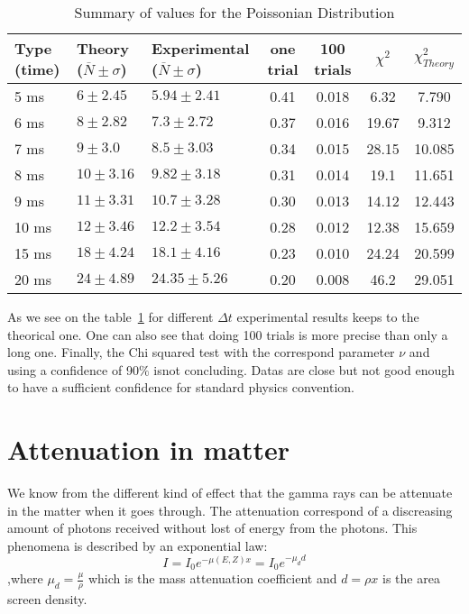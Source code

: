 \documentclass[a4paper,12pt,oneside]{article}
\begin{document}
\begin{table}[h!]
\centering
	\begin{tabular}{|p{2cm}|p{2cm}|p{3cm}|c|c|c|c|}
		 \hline
		 Type (time) & Theory ($\overline{N}\pm\sigma$)& Experimental ($\overline{N}\pm\sigma$) & one trial & 100 trials & $\chi^2$  & $\chi^2_{Theory}$\\
		\hline
		 5 ms & $6\pm 2.45$ & $5.94\pm 2.41$ & 0.41 & 0.018 & 6.32 & 7.790\\
		 6 ms & $8\pm 2.82$ & $7.3\pm 2.72$ & 0.37 & 0.016 & 19.67 & 9.312\\
		 7 ms & $9\pm 3.0$ & $8.5\pm 3.03$ & 0.34 & 0.015 & 28.15 & 10.085\\
		 8 ms & $10\pm 3.16$ & $9.82\pm 3.18$ & 0.31 & 0.014 & 19.1 & 11.651\\
		 9 ms & $11\pm 3.31$ & $10.7\pm 3.28$ & 0.30 & 0.013 & 14.12 & 12.443\\
		 10 ms & $12\pm 3.46$ & $12.2\pm 3.54$ & 0.28 & 0.012 & 12.38 & 15.659\\
		 15 ms & $18\pm 4.24$ & $18.1\pm 4.16$ & 0.23 & 0.010 & 24.24 & 20.599\\
		 20 ms & $24\pm 4.89$ & $24.35\pm 5.26$ & 0.20 & 0.008 & 46.2 & 29.051\\
		\hline
	\end{tabular}
	\caption{Summary of values for the Poissonian Distribution}
	\label{tab:poisson}
\end{table}

As we see on the table~\ref{tab:poisson} for different $\Delta t$ experimental results keeps to the theorical one. One can also see that doing 100 trials is more precise than only a long one. Finally, the Chi squared test with the correspond parameter $\nu$ and using a confidence of 90$\%$ isnot concluding. Datas are close but not good enough to have a sufficient confidence for standard physics convention.

\newpage
\section{Attenuation in matter}
We know from the different kind of effect that the gamma rays can be attenuate in the matter when it goes through. The attenuation correspond of a discreasing amount of photons received without lost of energy from the photons.
This phenomena is described by an exponential law:
$$I=I_0e^{-\mu(E,Z)x}=I_0 e^{-\mu_d d}$$
,where $\mu_d=\frac{\mu}{\rho}$ which is the mass attenuation coefficient and $d=\rho x$ is the area screen density.
\end{document}
